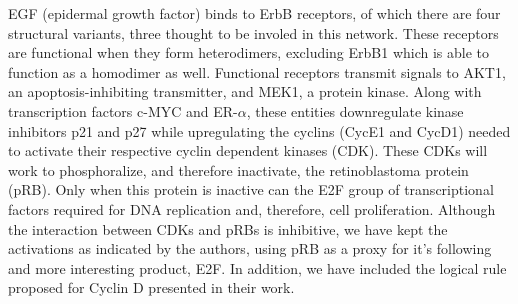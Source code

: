 \documentclass{article}
\begin{document}
EGF (epidermal growth factor) binds to ErbB receptors, of which there are four structural variants, three thought to be involed in this network. These receptors are functional when they form heterodimers, excluding ErbB1 which is able to function as a homodimer as well. Functional receptors transmit signals to AKT1, an apoptosis-inhibiting transmitter, and MEK1, a protein kinase. Along with transcription factors c-MYC and ER-$\alpha$, these entities downregulate kinase inhibitors p21 and p27 while upregulating the cyclins (CycE1 and CycD1) needed to activate their respective cyclin dependent kinases (CDK). These CDKs will work to phosphoralize, and therefore inactivate, the retinoblastoma protein (pRB). Only when this protein is inactive can the E2F group of transcriptional factors required for DNA replication and, therefore, cell proliferation. Although the interaction between CDKs and pRBs is inhibitive, we have kept the activations as indicated by the authors, using pRB as a proxy for it's following and more interesting product, E2F. In addition, we have included the logical rule proposed for Cyclin D presented in their work.
\begin{table}[h]
 \centering
\caption{The proposed logical rules for species with more than one regulator.}
\label{rules}
\end{table}


\end{document}
